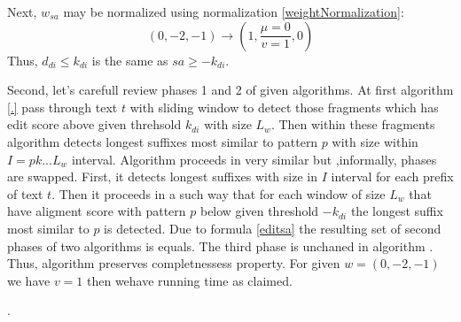 Next, $w_{sa}$ may be normalized using normalization \ref{weightNormalization}:
\begin{displaymath}
(0, -2, -1) \rightarrow (1,\frac{\mu=0}{v=1}, 0)
\end{displaymath}
Thus, $d_{di} \leq k_{di}$ is the same as $sa \geq -k_{di}$.

Second, let's carefull review phases 1 and 2 of given algorithms.
At first algorithm \ref{.} pass through text $t$ with sliding window to detect those fragments which has edit score above given threhsold $k_{di}$ with size $L_{w}$.
Then within these fragments algorithm detects longest suffixes most similar to pattern $p$ with size within  $I=pk...L_{w}$ interval.
Algorithm \cite{.} proceeds in very similar but ,informally, phases are swapped.
First, it detects longest suffixes with size in $I$ interval for each prefix of text $t$.
Then it proceeds in a such way that for each window of size $L_{w}$ that have aligment score with pattern $p$ below given threshold $-k_{di}$  the longest suffix most similar to $p$ is detected.
Due to formula  \ref{editsa} the resulting set of second phases of two algorithms is equals.
The third phase is unchaned in algorithm \cite{.}.
Thus, algorithm \cite{}  preserves  completnessess property.
For given $w = (0,-2,-1)$ we have $v=1$ then wehave running time as claimed.


%
 .


